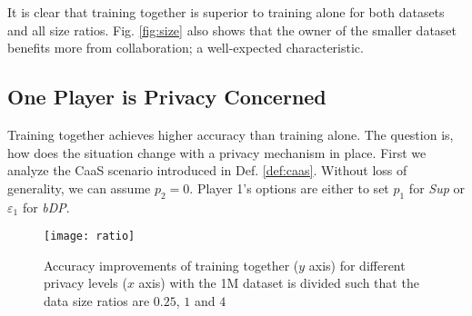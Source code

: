 \documentclass[USenglish,oneside,twocolumn]{article}
\theoremstyle{plain}
\begin{document}
    It is clear that training together is superior to training alone for both datasets and  all size ratios. Fig. \ref{fig:size} also shows that the owner of the smaller dataset benefits more from collaboration; a well-expected characteristic.
    
    
    
    \vspace{-0.5cm}
    \subsection{One Player is Privacy Concerned}
    \label{sec:exp_unc}
    \vspace{-0.25cm}
    
    Training together achieves higher accuracy than training alone. The question is, how does the situation change with a privacy mechanism in place. First we analyze the CaaS scenario introduced in Def. \ref{def:caas}. Without loss of generality, we can assume $p_2=0$. Player 1's options are either to set $p_1$ for \textit{Sup} or $\varepsilon_1$ for \textit{bDP}. 
    
    \vspace{-0.25cm}
    \begin{figure}[h]
        \centering
        \texttt{[image: ratio]}
        \caption{Accuracy improvements of training together ($y$ axis) for different privacy levels ($x$ axis) with the 1M dataset is divided such that the data size ratios are $0.25$, $1$ and $4$}
        \label{fig:ratio}
    \end{figure}
    \vspace{-0.25cm}
    
\end{document}
